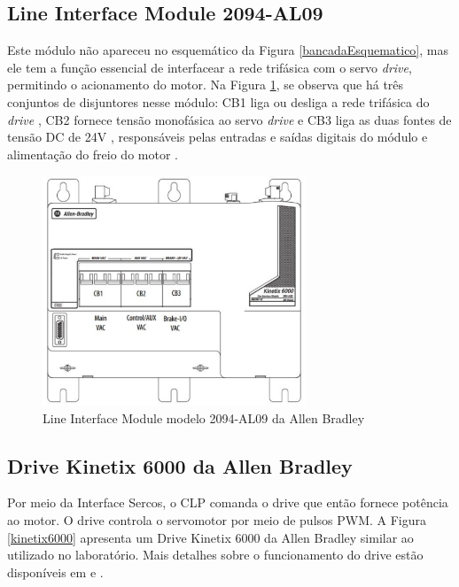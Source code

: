 \subsection{Line Interface Module 2094-AL09}

Este módulo não apareceu no esquemático da Figura \ref{bancadaEsquematico}, mas ele tem a função essencial de interfacear a rede trifásica com o servo \textit{drive}, permitindo o acionamento do motor. Na Figura \ref{LineInterfaceModule}, se observa que há três conjuntos de disjuntores nesse módulo: CB1 \textendash{} liga ou desliga a rede trifásica do \textit{drive}  \textendash{}, CB2 \textendash{} fornece tensão monofásica ao servo \textit{drive} \textendash{} e CB3 \textendash{} liga as duas fontes de tensão DC de 24V \textendash{}, responsáveis pelas entradas e saídas digitais do módulo e alimentação do freio do motor \cite{redytton}.

\begin{figure}[!ht]
  \centering
    \includegraphics[width=0.7\textwidth]{figs/fundamentos/LineInterfaceModule}
    \caption{Line Interface Module modelo 2094-AL09 da Allen Bradley \cite{redytton}\label{LineInterfaceModule}}
\end{figure}

\subsection{Drive Kinetix 6000 da Allen Bradley}

Por meio da Interface Sercos, o CLP comanda o drive que então fornece potência ao motor. O drive controla o servomotor por meio de pulsos PWM. A Figura \ref{kinetix6000} apresenta um Drive Kinetix 6000 da Allen Bradley similar ao utilizado no laboratório. Mais detalhes sobre o funcionamento do drive estão disponíveis em \cite{redytton} e \cite{kinetix6000usermanual}.

